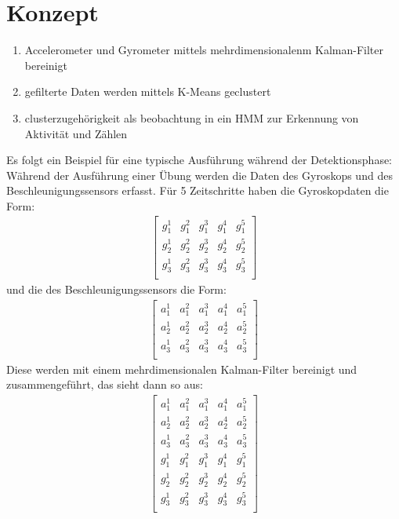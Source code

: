 \documentclass{article}
\begin{document}
\section{Konzept}
\begin{enumerate}
\item Accelerometer und Gyrometer mittels mehrdimensionalenm Kalman-Filter bereinigt
\item gefilterte Daten werden mittels K-Means geclustert
\item clusterzugehörigkeit als beobachtung in ein HMM zur Erkennung von Aktivität und Zählen
\end{enumerate}
Es folgt ein Beispiel für eine typische Ausführung während der Detektionsphase:\\
Während der Ausführung einer Übung werden die Daten des Gyroskops und des Beschleunigungssensors erfasst.
Für 5 Zeitschritte haben die Gyroskopdaten die Form:
\begin{align*}
\left[\begin{array}{rrrrr}
g_{1}^1 & g_{1}^2 & g_{1}^3 & g_{1}^4 & g_{1}^5 \\
g_{2}^1 & g_{2}^2 & g_{2}^3 & g_{2}^4 & g_{2}^5 \\
g_{3}^1 & g_{3}^2 & g_{3}^3 & g_{3}^4 & g_{3}^5 \\
\end{array}\right]
\end{align*}
und die des Beschleunigungssensors die Form:
\begin{align*}
\left[\begin{array}{rrrrr}
a_{1}^1 & a_{1}^2 & a_{1}^3 & a_{1}^4 & a_{1}^5 \\
a_{2}^1 & a_{2}^2 & a_{2}^3 & a_{2}^4 & a_{2}^5 \\
a_{3}^1 & a_{3}^2 & a_{3}^3 & a_{3}^4 & a_{3}^5 \\
\end{array}\right]
\end{align*}
Diese werden mit einem mehrdimensionalen Kalman-Filter bereinigt und zusammengeführt, das sieht dann so aus:
\begin{align*}
\left[\begin{array}{rrrrr}
a_{1}^1 & a_{1}^2 & a_{1}^3 & a_{1}^4 & a_{1}^5 \\
a_{2}^1 & a_{2}^2 & a_{2}^3 & a_{2}^4 & a_{2}^5 \\
a_{3}^1 & a_{3}^2 & a_{3}^3 & a_{3}^4 & a_{3}^5 \\
g_{1}^1 & g_{1}^2 & g_{1}^3 & g_{1}^4 & g_{1}^5 \\
g_{2}^1 & g_{2}^2 & g_{2}^3 & g_{2}^4 & g_{2}^5 \\
g_{3}^1 & g_{3}^2 & g_{3}^3 & g_{3}^4 & g_{3}^5 \\
\end{array}\right]
\end{align*}
\end{document}
